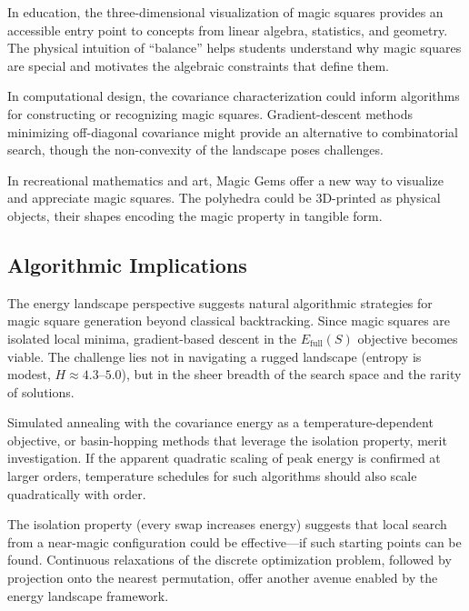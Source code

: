 In education, the three-dimensional visualization of magic squares
provides an accessible entry point to concepts from linear algebra, statistics, and geometry.
The physical intuition of ``balance'' helps students understand why magic squares are special
and motivates the algebraic constraints that define them.

In computational design, the covariance characterization could inform algorithms
for constructing or recognizing magic squares.
Gradient-descent methods minimizing off-diagonal covariance might provide 
an alternative to combinatorial search, though the non-convexity of the landscape poses challenges.

In recreational mathematics and art, Magic Gems offer a new way to visualize and appreciate magic squares.
The polyhedra could be 3D-printed as physical objects, 
their shapes encoding the magic property in tangible form.

\subsection{Algorithmic Implications}

The energy landscape perspective suggests natural algorithmic strategies 
for magic square generation beyond classical backtracking. 
Since magic squares are isolated local minima, gradient-based descent in the 
$E_{\mathrm{full}}(S)$ objective becomes viable. 
The challenge lies not in navigating a rugged landscape (entropy is modest, $H \approx 4.3$--$5.0$), 
but in the sheer breadth of the search space and the rarity of solutions.

Simulated annealing with the covariance energy as a temperature-dependent objective, 
or basin-hopping methods that leverage the isolation property, merit investigation. 
If the apparent quadratic scaling of peak energy is confirmed at larger orders, 
temperature schedules for such algorithms should also scale quadratically with order.

The isolation property (every swap increases energy) suggests that local search 
from a near-magic configuration could be effective---if such starting points can be found.
Continuous relaxations of the discrete optimization problem, 
followed by projection onto the nearest permutation, 
offer another avenue enabled by the energy landscape framework.
